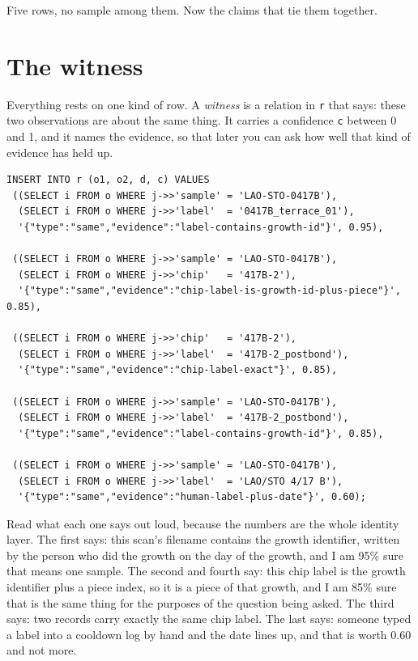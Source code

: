 Five rows, no sample among them. Now the claims that tie them together.

\section{The witness}

Everything rests on one kind of row. A \emph{witness} is a relation in \texttt{r} that says: these two observations are about the same thing. It carries a confidence \texttt{c} between 0 and 1, and it names the evidence, so that later you can ask how well that kind of evidence has held up.

\begin{lstlisting}
INSERT INTO r (o1, o2, d, c) VALUES
 ((SELECT i FROM o WHERE j->>'sample' = 'LAO-STO-0417B'),
  (SELECT i FROM o WHERE j->>'label'  = '0417B_terrace_01'),
  '{"type":"same","evidence":"label-contains-growth-id"}', 0.95),

 ((SELECT i FROM o WHERE j->>'sample' = 'LAO-STO-0417B'),
  (SELECT i FROM o WHERE j->>'chip'   = '417B-2'),
  '{"type":"same","evidence":"chip-label-is-growth-id-plus-piece"}', 0.85),

 ((SELECT i FROM o WHERE j->>'chip'   = '417B-2'),
  (SELECT i FROM o WHERE j->>'label'  = '417B-2_postbond'),
  '{"type":"same","evidence":"chip-label-exact"}', 0.85),

 ((SELECT i FROM o WHERE j->>'sample' = 'LAO-STO-0417B'),
  (SELECT i FROM o WHERE j->>'label'  = '417B-2_postbond'),
  '{"type":"same","evidence":"label-contains-growth-id"}', 0.85),

 ((SELECT i FROM o WHERE j->>'sample' = 'LAO-STO-0417B'),
  (SELECT i FROM o WHERE j->>'label'  = 'LAO/STO 4/17 B'),
  '{"type":"same","evidence":"human-label-plus-date"}', 0.60);
\end{lstlisting}

Read what each one says out loud, because the numbers are the whole identity layer. The first says: this scan's filename contains the growth identifier, written by the person who did the growth on the day of the growth, and I am 95\% sure that means one sample. The second and fourth say: this chip label is the growth identifier plus a piece index, so it is a piece of that growth, and I am 85\% sure that is the same thing for the purposes of the question being asked. The third says: two records carry exactly the same chip label. The last says: someone typed a label into a cooldown log by hand and the date lines up, and that is worth 0.60 and not more.

